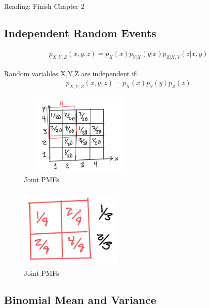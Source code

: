 
 Reading: Finish Chapter 2

\subsection{Independent Random Events}


\begin{align*}
p_{X,Y,Z}(x,y,z)=p_X(x)p_{Y|X}(y|x)p_{Z|X,Y}(z|x,y)
\end{align*}

Random variables X,Y,Z are independent if:
\begin{align*}
p_{X,Y,Z}(x,y,z)=p_X(x)p_{Y}(y)p_{Z}(z)
\end{align*}

\begin{figure}[h]
\centering
\includegraphics[width=6cm, height=4cm]{images/L07/IMG_1544.jpeg}
\caption{Joint PMFs}
\end{figure}

\begin{figure}[h]
\centering
\includegraphics[width=5cm, height=4cm]{images/L07/IMG_1545.jpeg}
\caption{Joint PMFs}
\end{figure}



\subsection{Binomial Mean and Variance}


